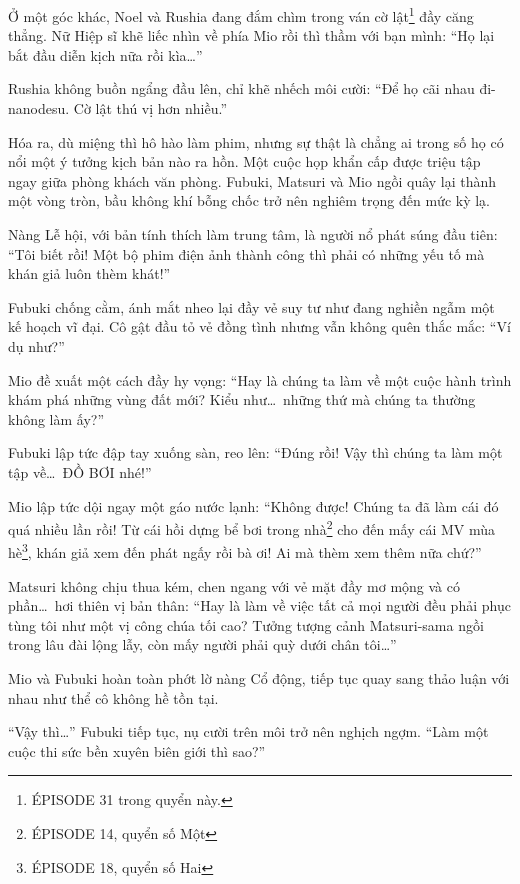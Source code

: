 \documentclass[../main.tex]{subfiles}
\begin{document}
Ở một góc khác, Noel và Rushia đang đắm chìm trong ván cờ lật\footnote{{\flaregothic ÉPISODE 31} trong quyển này.} đầy căng thẳng. Nữ Hiệp sĩ khẽ liếc nhìn về phía Mio rồi thì thầm với bạn mình: ``Họ lại bắt đầu diễn kịch nữa rồi kìa\dots''

Rushia không buồn ngẩng đầu lên, chỉ khẽ nhếch môi cười: ``Để họ cãi nhau đi-nanodesu. Cờ lật thú vị hơn nhiều.''

\ct

Hóa ra, dù miệng thì hô hào làm phim, nhưng sự thật là chẳng ai trong số họ có nổi một ý tưởng kịch bản nào ra hồn. Một cuộc họp khẩn cấp được triệu tập ngay giữa phòng khách văn phòng. Fubuki, Matsuri và Mio ngồi quây lại thành một vòng tròn, bầu không khí bỗng chốc trở nên nghiêm trọng đến mức kỳ lạ.

Nàng Lễ hội, với bản tính thích làm trung tâm, là người nổ phát súng đầu tiên: ``Tôi biết rồi! Một bộ phim điện ảnh thành công thì phải có những yếu tố mà khán giả luôn thèm khát!''

Fubuki chống cằm, ánh mắt nheo lại đầy vẻ suy tư như đang nghiền ngẫm một kế hoạch vĩ đại. Cô gật đầu tỏ vẻ đồng tình nhưng vẫn không quên thắc mắc: ``Ví dụ như?''

Mio đề xuất một cách đầy hy vọng: ``Hay là chúng ta làm về một cuộc hành trình khám phá những vùng đất mới? Kiểu như\dots\ những thứ mà chúng ta thường không làm ấy?''

Fubuki lập tức đập tay xuống sàn, reo lên: ``Đúng rồi! Vậy thì chúng ta làm một tập về\dots\ ĐỒ BƠI nhé!''

Mio lập tức dội ngay một gáo nước lạnh: ``Không được! Chúng ta đã làm cái đó quá nhiều lần rồi! Từ cái hồi dựng bể bơi trong nhà\footnote{{\flaregothic ÉPISODE 14}, quyển số Một} cho đến mấy cái MV mùa hè\footnote{{\flaregothic ÉPISODE 18}, quyển số Hai}, khán giả xem đến phát ngấy rồi bà ơi! Ai mà thèm xem thêm nữa chứ?''

Matsuri không chịu thua kém, chen ngang với vẻ mặt đầy mơ mộng và có phần\dots\ hơi thiên vị bản thân: ``Hay là làm về việc tất cả mọi người đều phải phục tùng tôi như một vị công chúa tối cao? Tưởng tượng cảnh Matsuri-sama ngồi trong lâu đài lộng lẫy, còn mấy người phải quỳ dưới chân tôi\dots''

Mio và Fubuki hoàn toàn phớt lờ nàng Cổ động, tiếp tục quay sang thảo luận với nhau như thể cô không hề tồn tại.


``Vậy thì\dots'' Fubuki tiếp tục, nụ cười trên môi trở nên nghịch ngợm. ``Làm một cuộc thi sức bền xuyên biên giới thì sao?''
\end{document}
